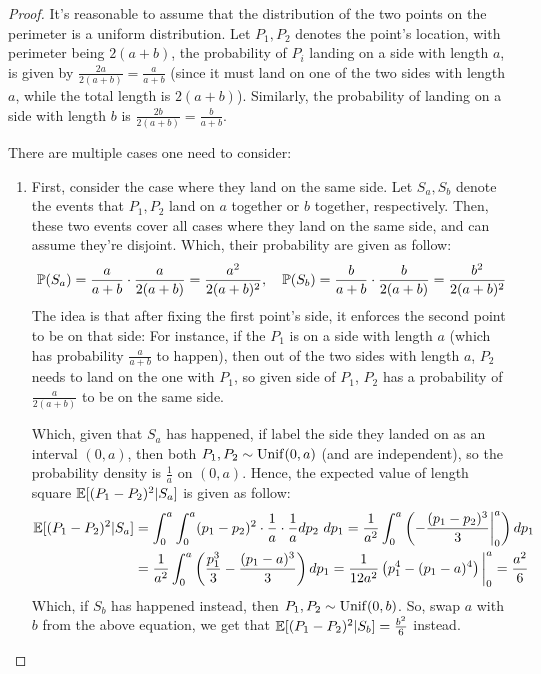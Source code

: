 \documentclass{article}
\begin{document}
\begin{proof}
    It's reasonable to assume that the distribution of the two points on the perimeter is a uniform distribution. Let $P_1,P_2$ denotes the point's location, with perimeter being $2(a+b)$, the probability of $P_i$ landing on a side with length $a$, is given by $\frac{2a}{2(a+b)}=\frac{a}{a+b}$ (since it must land on one of the two sides with length $a$, while the total length is $2(a+b)$). Similarly, the probability of landing on a side with length $b$ is $\frac{2b}{2(a+b)}=\frac{b}{a+b}$.

    \hfil

    There are multiple cases one need to consider:
    \begin{enumerate}
        \item First, consider the case where they land on the same side. Let $S_a,S_b$ denote the events that $P_1,P_2$ land on $a$ together or $b$ together, respectively. Then, these two events cover all cases where they land on the same side, and can assume they're disjoint. Which, their probability are given as follow:
        \begin{align}
            \mathbb{P}(S_a) = \frac{a}{a+b}\cdot \frac{a}{2(a+b)} = \frac{a^2}{2(a+b)^2},\quad \mathbb{P}(S_b) = \frac{b}{a+b}\cdot \frac{b}{2(a+b)} = \frac{b^2}{2(a+b)^2}
        \end{align}
        The idea is that after fixing the first point's side, it enforces the second point to be on that side: For instance, if the $P_1$ is on a side with length $a$ (which has probability $\frac{a}{a+b}$ to happen), then out of the two sides with length $a$, $P_2$ needs to land on the one with $P_1$, so given side of $P_1$, $P_2$ has a probability of $\frac{a}{2(a+b)}$ to be on the same side.

        Which, given that $S_a$ has happened, if label the side they landed on as an interval $(0,a)$, then both $P_1,P_2\sim \mathrm{Unif}(0,a)$ (and are independent), so the probability density is $\frac{1}{a}$ on $(0,a)$. Hence, the expected value of length square $\mathbb{E}[(P_1-P_2)^2|S_a]$ is given as follow:
        \begin{align}
            \mathbb{E}[(P_1-P_2)^2|S_a] &= \int_{0}^{a}\int_{0}^{a}(p_1-p_2)^2\cdot \frac{1}{a}\cdot \frac{1}{a}dp_2\ dp_1 = \frac{1}{a^2}\int_{0}^{a}\left(-\frac{(p_1-p_2)^3}{3}\bigg|_{0}^{a}\right)dp_1\\
            &= \frac{1}{a^2}\int_{0}^{a}\left(\frac{p_1^3}{3}-\frac{(p_1-a)^3}{3}\right)dp_1 = \frac{1}{12a^2}\left(p_1^4-(p_1-a)^4\right)\bigg|_{0}^{a} = \frac{a^2}{6}
        \end{align}
        Which, if $S_b$ has happened instead, then $P_1,P_2\sim\mathrm{Unif}(0,b)$. So, swap $a$ with $b$ from the above equation, we get that $\mathbb{E}[(P_1-P_2)^2|S_b] = \frac{b^2}{6}$ instead.


\end{enumerate}
\end{proof}
\end{document}

